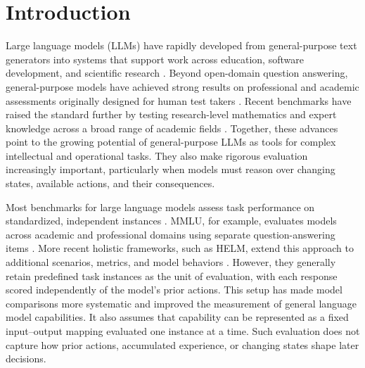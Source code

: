 \documentclass[pdflatex,sn-mathphys-num]{sn-jnl}%
\theoremstyle{thmstyleone}%
\theoremstyle{thmstyletwo}%
\theoremstyle{thmstylethree}%
\begin{document}
\section{Introduction}\label{sec1}

Large language models (LLMs) have rapidly developed from general-purpose text generators into systems that support work across education, software development, and scientific research \cite{zhao2023survey,kasneci2023chatgpt,peng2023impact,noy2023experimental,boiko2023autonomous}. Beyond open-domain question answering, general-purpose models have achieved strong results on professional and academic assessments originally designed for human test takers \cite{openai2023gpt4}. Recent benchmarks have raised the standard further by testing research-level mathematics and expert knowledge across a broad range of academic fields \cite{glazer2024frontiermath,hle2026benchmark}. Together, these advances point to the growing potential of general-purpose LLMs as tools for complex intellectual and operational tasks. They also make rigorous evaluation increasingly important, particularly when models must reason over changing states, available actions, and their consequences.

Most benchmarks for large language models assess task performance on standardized, independent instances \cite{srivastava2022beyond}. MMLU, for example, evaluates models across academic and professional domains using separate question-answering items \cite{hendrycks2020measuring}. More recent holistic frameworks, such as HELM, extend this approach to additional scenarios, metrics, and model behaviors \cite{liang2022holistic}. However, they generally retain predefined task instances as the unit of evaluation, with each response scored independently of the model's prior actions. This setup has made model comparisons more systematic and improved the measurement of general language model capabilities. It also assumes that capability can be represented as a fixed input--output mapping evaluated one instance at a time. Such evaluation does not capture how prior actions, accumulated experience, or changing states shape later decisions.
\end{document}
